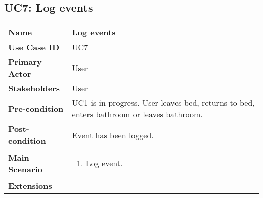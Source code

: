  
   
    \subsection{UC7: Log events} 
    \begin{tabular}{|p{}||p{}|}
        \hline
        \textbf{Name} &  Log events\\
        \hline
        \textbf{Use Case ID} & UC7 \\
        \hline
        \textbf{Primary Actor} & User \\
        \hline 
        \textbf{Stakeholders} & User \\
        \hline
        \textbf{Pre-condition} & UC1 is in progress. User leaves bed, returns to bed, enters bathroom or leaves bathroom. \\
        \hline
        \textbf{Post-condition} & Event has been logged. \\
        \hline
        \textbf{Main Scenario} & 
            \begin{enumerate}
                \item Log event.
            \end{enumerate}
        \\
        \hline
        \textbf{Extensions} & - \\
        \hline
    \end{tabular}
    
